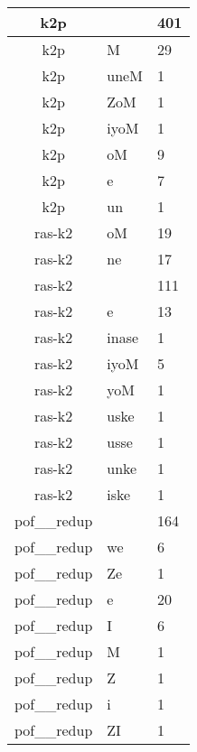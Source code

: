 \documentclass[a4 paper]{article}
\begin{document}
\begin{longtable}{cp{}p{}}
k2p &  & 401\\ \midrule k2p & M & 29\\ \midrule k2p & uneM & 1\\ \midrule k2p & ZoM & 1\\ \midrule k2p & iyoM & 1\\ \midrule k2p & oM & 9\\ \midrule k2p & e & 7\\ \midrule k2p & un & 1\\ \midrule 
ras-k2 & oM & 19\\ \midrule ras-k2 & ne & 17\\ \midrule ras-k2 &  & 111\\ \midrule ras-k2 & e & 13\\ \midrule ras-k2 & inase & 1\\ \midrule ras-k2 & iyoM & 5\\ \midrule ras-k2 & yoM & 1\\ \midrule ras-k2 & uske & 1\\ \midrule ras-k2 & usse & 1\\ \midrule ras-k2 & unke & 1\\ \midrule ras-k2 & iske & 1\\ \midrule 
pof\_\_redup &  & 164\\ \midrule pof\_\_redup & we & 6\\ \midrule pof\_\_redup & Ze & 1\\ \midrule pof\_\_redup & e & 20\\ \midrule pof\_\_redup & I & 6\\ \midrule pof\_\_redup & M & 1\\ \midrule pof\_\_redup & Z & 1\\ \midrule pof\_\_redup & i & 1\\ \midrule pof\_\_redup & ZI & 1\\ \midrule 

\end{longtable}
\end{document}
